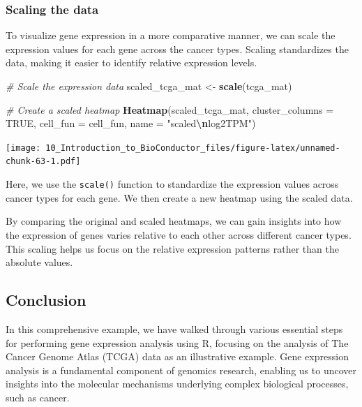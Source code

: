 \documentclass[
]{book}
\newenvironment{Shaded}{\begin{snugshade}}{\end{snugshade}}
\newcommand{\AttributeTok}[1]{\textcolor[rgb]{0.13,0.29,0.53}{#1}}
\newcommand{\CommentTok}[1]{\textcolor[rgb]{0.56,0.35,0.01}{\textit{#1}}}
\newcommand{\ConstantTok}[1]{\textcolor[rgb]{0.56,0.35,0.01}{#1}}
\newcommand{\FunctionTok}[1]{\textcolor[rgb]{0.13,0.29,0.53}{\textbf{#1}}}
\newcommand{\NormalTok}[1]{#1}
\newcommand{\OtherTok}[1]{\textcolor[rgb]{0.56,0.35,0.01}{#1}}
\newcommand{\SpecialCharTok}[1]{\textcolor[rgb]{0.81,0.36,0.00}{\textbf{#1}}}
\newcommand{\StringTok}[1]{\textcolor[rgb]{0.31,0.60,0.02}{#1}}
\begin{document}
\hypertarget{scaling-the-data}{%
\subsubsection{Scaling the data}\label{scaling-the-data}}

To visualize gene expression in a more comparative manner, we can scale the expression values for each gene across the cancer types. Scaling standardizes the data, making it easier to identify relative expression levels.

\begin{Shaded}
\begin{Highlighting}[]
\CommentTok{\# Scale the expression data}
\NormalTok{scaled\_tcga\_mat }\OtherTok{\textless{}{-}} \FunctionTok{scale}\NormalTok{(tcga\_mat)}

\CommentTok{\# Create a scaled heatmap}
\FunctionTok{Heatmap}\NormalTok{(scaled\_tcga\_mat, }
        \AttributeTok{cluster\_columns =} \ConstantTok{TRUE}\NormalTok{, }
        \AttributeTok{cell\_fun =}\NormalTok{ cell\_fun, }
        \AttributeTok{name =} \StringTok{"scaled}\SpecialCharTok{\textbackslash{}n}\StringTok{log2TPM"}\NormalTok{)}
\end{Highlighting}
\end{Shaded}

\texttt{[image: 10\_Introduction\_to\_BioConductor\_files/figure-latex/unnamed-chunk-63-1.pdf]}

Here, we use the \texttt{scale()} function to standardize the expression values across cancer types for each gene. We then create a new heatmap using the scaled data.

By comparing the original and scaled heatmaps, we can gain insights into how the expression of genes varies relative to each other across different cancer types. This scaling helps us focus on the relative expression patterns rather than the absolute values.

\hypertarget{conclusion-30}{%
\subsection{Conclusion}\label{conclusion-30}}

In this comprehensive example, we have walked through various essential steps for performing gene expression analysis using R, focusing on the analysis of The Cancer Genome Atlas (TCGA) data as an illustrative example. Gene expression analysis is a fundamental component of genomics research, enabling us to uncover insights into the molecular mechanisms underlying complex biological processes, such as cancer.
\end{document}
